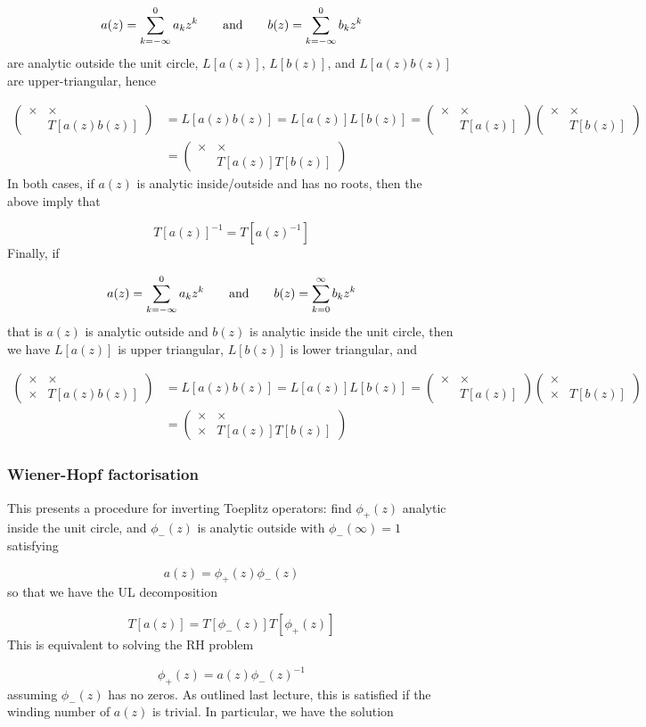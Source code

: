 \documentclass[12pt,landscape]{article}
\def\qqand{\qquad\hbox{and}\qquad}
\def\addtab#1={#1\;&=}
\def\ccr{\\\addtab}
\def\sopmatrix#1{ \begin{pmatrix}#1\end{pmatrix} }
\def\addtab#1={#1\;&=}
\def\ccr{\\\addtab}
\begin{document}
{\[
a(z) = \sum_{k=-\infty}^0 a_k z^k \qqand b(z) = \sum_{k=-\infty}^0 b_k z^k
\]
are analytic outside the unit circle, $L[a(z)]$, $L[b(z)]$, and $L[a(z) b(z)]$ are upper-triangular, hence


\begin{align*}
\sopmatrix{
\times & \times \\  & T[a(z) b(z)]
} &= L[a(z)b(z)] = L[a(z)] L[b(z)] =  \sopmatrix{
\times & \times \\  & T[a(z)]
} \sopmatrix{
\times & \times  \\  & T[b(z)]
} \ccr
= \sopmatrix{
\times & \times  \\  & T[a(z)] T[b(z)]
}
\end{align*}
In both cases, if $a(z)$ is analytic inside/outside and has no roots, then the above imply that

\[
T[a(z)]^{-1} = T[a(z)^{-1}]
\]
Finally, if

\[
a(z) = \sum_{k=-\infty}^0 a_k z^k \qqand b(z) = \sum_{k=0}^\infty b_k z^k
\]
that is $a(z)$ is analytic outside and $b(z)$ is analytic inside the unit circle, then we have $L[a(z)]$ is upper triangular, $L[b(z)]$ is lower triangular, and


\begin{align*}
\sopmatrix{
\times & \times \\ \times & T[a(z) b(z)]
} &= L[a(z)b(z)] = L[a(z)] L[b(z)] =  \sopmatrix{
\times & \times \\  & T[a(z)]
} \sopmatrix{
\times &   \\ \times & T[b(z)]
} \ccr
= \sopmatrix{
\times & \times  \\ \times & T[a(z)] T[b(z)]
}
\end{align*}
\newpage
\subsubsection{Wiener-Hopf factorisation}
This presents a procedure for inverting Toeplitz operators: find $\phi_+(z)$ analytic inside the unit circle, and $\phi_-(z)$ is analytic outside with $\phi_-(\infty) = 1$ satisfying

\[
a(z) = \phi_+(z) \phi_-(z)
\]
so that we have the UL decomposition

\[
T[a(z)] = T[\phi_-(z)] T[\phi_+(z)]
\]
This is equivalent to solving the RH problem

\[
\phi_+(z) = a(z) \phi_-(z)^{-1}
\]
assuming $\phi_-(z)$ has no zeros. As outlined last lecture, this is satisfied if the winding number of $a(z)$ is trivial. In particular, we have the solution

}
\end{document}
